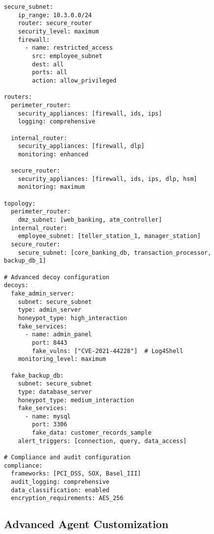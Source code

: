 \documentclass[12pt,a4paper]{article}
\begin{document}
\begin{lstlisting}[caption=Custom Financial Institution Network]
  secure_subnet:
    ip_range: 10.3.0.0/24
    router: secure_router
    security_level: maximum
    firewall:
      - name: restricted_access
        src: employee_subnet
        dest: all
        ports: all
        action: allow_privileged

routers:
  perimeter_router:
    security_appliances: [firewall, ids, ips]
    logging: comprehensive
  
  internal_router:
    security_appliances: [firewall, dlp]
    monitoring: enhanced
  
  secure_router:
    security_appliances: [firewall, ids, ips, dlp, hsm]
    monitoring: maximum

topology:
  perimeter_router:
    dmz_subnet: [web_banking, atm_controller]
  internal_router:
    employee_subnet: [teller_station_1, manager_station]
  secure_router:
    secure_subnet: [core_banking_db, transaction_processor, backup_db_1]

# Advanced decoy configuration
decoys:
  fake_admin_server:
    subnet: secure_subnet
    type: admin_server
    honeypot_type: high_interaction
    fake_services:
      - name: admin_panel
        port: 8443
        fake_vulns: ["CVE-2021-44228"]  # Log4Shell
    monitoring_level: maximum
    
  fake_backup_db:
    subnet: secure_subnet
    type: database_server
    honeypot_type: medium_interaction
    fake_services:
      - name: mysql
        port: 3306
        fake_data: customer_records_sample
    alert_triggers: [connection, query, data_access]

# Compliance and audit configuration
compliance:
  frameworks: [PCI_DSS, SOX, Basel_III]
  audit_logging: comprehensive
  data_classification: enabled
  encryption_requirements: AES_256
\end{lstlisting}

\subsection{Advanced Agent Customization}
\end{document}
